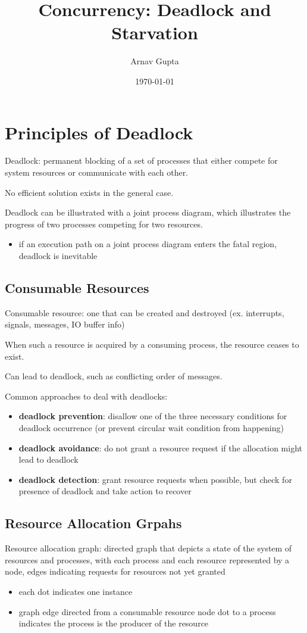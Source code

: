 \documentclass[11pt]{article}
\author{Arnav Gupta}
\date{\today}
\title{Concurrency: Deadlock and Starvation}
\begin{document}
\maketitle
\tableofcontents

\section{Principles of Deadlock}
\label{sec:orgee056ca}
Deadlock: permanent blocking of a set of processes that either compete
for system resources or communicate with each other.

No efficient solution exists in the general case.

Deadlock can be illustrated with a joint process diagram, which
illustrates the progress of two processes competing for two resources.
\begin{itemize}
\item if an execution path on a joint process diagram enters the fatal region,
deadlock is inevitable
\end{itemize}
\subsection{Consumable Resources}
\label{sec:org8b92b24}
Consumable resource: one that can be created and destroyed (ex. interrupts,
signals, messages, IO buffer info)

When such a resource is acquired by a consuming process, the resource
ceases to exist.

Can lead to deadlock, such as conflicting order of messages.

Common approaches to deal with deadlocks:
\begin{itemize}
\item \textbf{deadlock prevention}: disallow one of the three necessary conditions
for deadlock occurrence (or prevent circular wait condition from
happening)
\item \textbf{deadlock avoidance}: do not grant a resource request if the allocation might lead to deadlock
\item \textbf{deadlock detection}: grant resource requests when possible, but check
for presence of deadlock and take action to recover
\end{itemize}
\subsection{Resource Allocation Grpahs}
\label{sec:org0ba15c3}
Resource allocation graph: directed graph that depicts a state of the system
of resources and processes, with each process and each resource represented
by a node, edges indicating requests for resources not yet granted
\begin{itemize}
\item each dot indicates one instance
\item graph edge directed from a consumable resource node dot to a process
indicates the process is the producer of the resource
\end{itemize}
\end{document}
